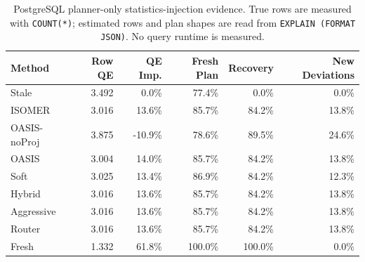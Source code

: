 \begin{table}[t]
  \centering
  \small
  \caption{PostgreSQL planner-only statistics-injection evidence. True rows are measured with \texttt{COUNT(*)}; estimated rows and plan shapes are read from \texttt{EXPLAIN (FORMAT JSON)}. No query runtime is measured.}
  \label{tab:postgres_planner_stats_injection}
  \setlength{\tabcolsep}{4pt}
  \begin{tabular}{lrrrrr}
    \toprule
    Method & Row QE & QE Imp. & Fresh Plan & Recovery & New Deviations \\
    \midrule
    Stale & 3.492 & 0.0\% & 77.4\% & 0.0\% & 0.0\% \\
    ISOMER & 3.016 & 13.6\% & 85.7\% & 84.2\% & 13.8\% \\
    OASIS-noProj & 3.875 & -10.9\% & 78.6\% & 89.5\% & 24.6\% \\
    OASIS & 3.004 & 14.0\% & 85.7\% & 84.2\% & 13.8\% \\
    Soft & 3.025 & 13.4\% & 86.9\% & 84.2\% & 12.3\% \\
    Hybrid & 3.016 & 13.6\% & 85.7\% & 84.2\% & 13.8\% \\
    Aggressive & 3.016 & 13.6\% & 85.7\% & 84.2\% & 13.8\% \\
    Router & 3.016 & 13.6\% & 85.7\% & 84.2\% & 13.8\% \\
    Fresh & 1.332 & 61.8\% & 100.0\% & 100.0\% & 0.0\% \\
    \bottomrule
  \end{tabular}
\end{table}
